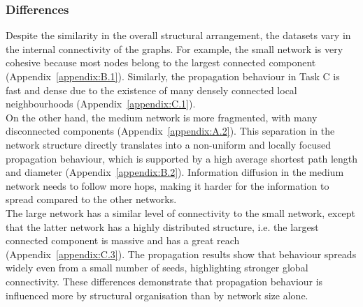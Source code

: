 \documentclass[acmsmall,nonacm,natbib=false]{acmart}
\begin{document}
\subsubsection{\textbf{\Large{Differences}}}
\leavevmode \par \noindent
Despite the similarity in the overall structural arrangement, the datasets vary in the internal connectivity of the graphs. For example, the small network is very cohesive because most nodes belong to the largest connected component (Appendix~\ref{appendix:B.1}). Similarly, the propagation behaviour in Task C is fast and dense due to the existence of many densely connected local neighbourhoods (Appendix~\ref{appendix:C.1}).\\
On the other hand, the medium network is more fragmented, with many disconnected components (Appendix~\ref{appendix:A.2}). This separation in the network structure directly translates into a non-uniform and locally focused propagation behaviour, which is supported by a high average shortest path length and diameter (Appendix~\ref{appendix:B.2}).  Information diffusion in the medium network needs to follow more hops, making it harder for the information to spread compared to the other networks.\\
The large network has a similar level of connectivity to the small network, except that the latter network has a highly distributed structure, i.e. the largest connected component is massive and has a great reach (Appendix~\ref{appendix:C.3}). The propagation results show that behaviour spreads widely even from a small number of seeds, highlighting stronger global connectivity. These differences demonstrate that propagation behaviour is influenced more by structural organisation than by network size alone.
\end{document}
